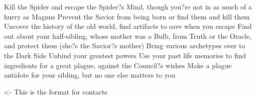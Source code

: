 \documentclass[char]{Silversiders}
\begin{document}
\name{\cPestilence{}}

Kill the Spider and escape the Spider?s Mind, though you?re not in as much of a hurry as Magnus
Prevent the Savior from being born or find them and kill them
Uncover the history of the old world, find artifacts to save when you escape
Find out about your half-sibling, whose mother was a Bulb, from Truth or the Oracle, and protect them (she?s the Savior?s mother)
Bring various archetypes over to the Dark Side
Unbind your greatest powers
Use your past life memories to find ingredients for a great plague, against the Council?s wishes
Make a plague antidote for your sibling, but no one else matters to you

\begin{itemz}[Goals]
	\item 
\end{itemz}

\begin{itemz}[Notes]
	\item 
\end{itemz}

\begin{contacts}
	\contact{\cTest{}} <- This is the format for contacts 
\end{contacts}
\end{document}
